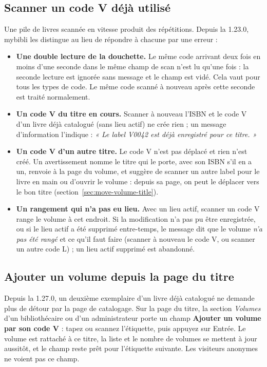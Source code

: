 \subsection*{Scanner un code V déjà utilisé}
\label{sec:scan-existing-vcode}

Une pile de livres scannée en vitesse produit des répétitions. Depuis
la 1.23.0, mybibli les distingue au lieu de répondre à chacune par une
erreur :

\begin{itemize}
  \item \textbf{Une double lecture de la douchette.} Le même code
        arrivant deux fois en moins d'une seconde dans le même champ de
        scan n'est lu qu'une fois : la seconde lecture est ignorée sans
        message et le champ est vidé. Cela vaut pour tous les types de
        code. Le même code scanné à nouveau après cette seconde est
        traité normalement.
  \item \textbf{Un code V du titre en cours.} Scanner à nouveau l'ISBN
        et le code V d'un livre déjà catalogué (sans lieu actif) ne
        crée rien ; un message d'information l'indique : \emph{« Le
        label V0042 est déjà enregistré pour ce titre. »}
  \item \textbf{Un code V d'un autre titre.} Le code V n'est pas
        déplacé et rien n'est créé. Un avertissement nomme le titre qui
        le porte, avec son ISBN s'il en a un, renvoie à la page du
        volume, et suggère de scanner un autre label pour le livre
        en main ou d'ouvrir le volume : depuis sa page, on peut le
        déplacer vers le bon titre (section~\ref{sec:move-volume-title}).
  \item \textbf{Un rangement qui n'a pas eu lieu.} Avec un lieu actif,
        scanner un code V range le volume à cet endroit. Si la
        modification n'a pas pu être enregistrée, ou si le lieu actif a
        été supprimé entre-temps, le message dit que le volume
        \emph{n'a pas été rangé} et ce qu'il faut faire (scanner à
        nouveau le code V, ou scanner un autre code L) ; un lieu actif
        supprimé est abandonné.
\end{itemize}

\subsection*{Ajouter un volume depuis la page du titre}
\label{sec:title-add-volume}

Depuis la 1.27.0, un deuxième exemplaire d'un livre déjà catalogué ne
demande plus de détour par la page de catalogage. Sur la page du titre,
la section \emph{Volumes} d'un bibliothécaire ou d'un administrateur
porte un champ \textbf{Ajouter un volume par son code V} : tapez ou
scannez l'étiquette, puis appuyez sur Entrée. Le volume est rattaché à
ce titre, la liste et le nombre de volumes se mettent à jour aussitôt,
et le champ reste prêt pour l'étiquette suivante. Les visiteurs
anonymes ne voient pas ce champ.

